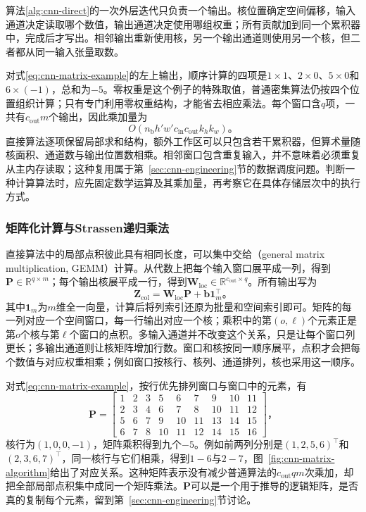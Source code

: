算法\ref{alg:cnn-direct}的一次外层迭代只负责一个输出。核位置确定空间偏移，输入通道决定读取哪个数值，输出通道决定使用哪组权重；所有贡献加到同一个累积器中，完成后才写出。相邻输出重新使用核，另一个输出通道则使用另一个核，但二者都从同一输入张量取数。

对式\eqref{eq:cnn-matrix-example}的左上输出，顺序计算的四项是$1\times1$、$2\times0$、$5\times0$和$6\times(-1)$，总和为$-5$。零权重是这个例子的特殊取值，普通密集算法仍按四个位置组织计算；只有专门利用零权重结构，才能省去相应乘法。每个窗口含$q$项，一共有$c_{\mathrm{out}}m$个输出，因此乘加量为
\begin{equation}
  O\!\left(n_{\mathrm b}h'w'c_{\mathrm{in}}c_{\mathrm{out}}k_hk_w\right)\text{。}
  \label{eq:cnn-direct-cost}
\end{equation}
直接算法逐项保留局部求和结构，额外工作区可以只包含若干累积器，但算术量随核面积、通道数与输出位置数相乘。相邻窗口包含重复输入，并不意味着必须重复从主内存读取；这种复用属于第~\ref{sec:cnn-engineering}节的数据调度问题。判断一种计算算法时，应先固定数学运算及其乘加量，再考察它在具体存储层次中的执行方式。

\subsubsection{矩阵化计算与Strassen递归乘法}
\label{sec:cnn-matrix-algorithm}

直接算法中的局部点积彼此具有相同长度，可以集中交给（general matrix multiplication, GEMM）计算。从代数上把每个输入窗口展平成一列，得到$\bm P\in\mathbb R^{q\times m}$；每个输出核展平成一行，得到$\bm W_{\mathrm{loc}}\in\mathbb R^{c_{\mathrm{out}}\times q}$。所有输出写为
\begin{equation}
  \bm Z_{\mathrm{col}}=\bm W_{\mathrm{loc}}\bm P+\bm b\bm1_m^\top\text{。}
  \label{eq:cnn-im2col}
\end{equation}
其中$\bm1_m$为$m$维全一向量，计算后将列索引还原为批量和空间索引即可。矩阵的每一列对应一个空间窗口，每一行输出对应一个核；乘积中的第$(o,\ell)$个元素正是第$o$个核与第$\ell$个窗口的点积。多输入通道并不改变这个关系，只是让每个窗口列更长；多输出通道则让核矩阵增加行数。窗口和核按同一顺序展平，点积才会把每个数值与对应权重相乘；例如窗口按核行、核列、通道排列，核也采用这一顺序。

对式\eqref{eq:cnn-matrix-example}，按行优先排列窗口与窗口中的元素，有
\begin{equation}
  \bm P=\begin{bmatrix}
    1&2&3&5&6&7&9&10&11\\
    2&3&4&6&7&8&10&11&12\\
    5&6&7&9&10&11&13&14&15\\
    6&7&8&10&11&12&14&15&16
  \end{bmatrix}\text{，}
  \label{eq:cnn-im2col-example}
\end{equation}
核行为$(1,0,0,-1)$，矩阵乘积得到九个$-5$。例如前两列分别是$(1,2,5,6)^\top$和$(2,3,6,7)^\top$，同一核行与它们相乘，得到$1-6$与$2-7$，图~\ref{fig:cnn-matrix-algorithm}给出了对应关系。这种矩阵表示没有减少普通算法的$c_{\mathrm{out}}qm$次乘加，却把全部局部点积集中成同一个矩阵乘法。$\bm P$可以是一个用于推导的逻辑矩阵，是否真的复制每个元素，留到第~\ref{sec:cnn-engineering}节讨论。


